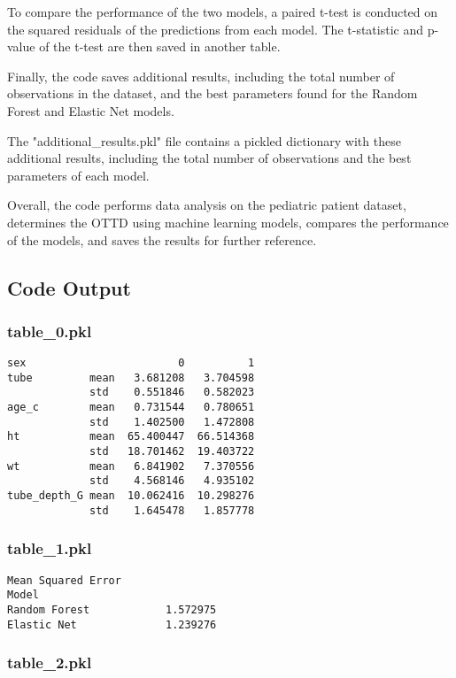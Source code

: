 \documentclass[11pt]{article}
\begin{document}
To compare the performance of the two models, a paired t-test is conducted on the squared residuals of the predictions from each model. The t-statistic and p-value of the t-test are then saved in another table.

Finally, the code saves additional results, including the total number of observations in the dataset, and the best parameters found for the Random Forest and Elastic Net models.

The "additional\_results.pkl" file contains a pickled dictionary with these additional results, including the total number of observations and the best parameters of each model.

Overall, the code performs data analysis on the pediatric patient dataset, determines the OTTD using machine learning models, compares the performance of the models, and saves the results for further reference.

\subsection{Code Output}

\subsubsection*{table\_0.pkl}

\begin{Verbatim}[tabsize=4]
sex                        0          1
tube         mean   3.681208   3.704598
             std    0.551846   0.582023
age_c        mean   0.731544   0.780651
             std    1.402500   1.472808
ht           mean  65.400447  66.514368
             std   18.701462  19.403722
wt           mean   6.841902   7.370556
             std    4.568146   4.935102
tube_depth_G mean  10.062416  10.298276
             std    1.645478   1.857778
\end{Verbatim}

\subsubsection*{table\_1.pkl}

\begin{Verbatim}[tabsize=4]
               Mean Squared Error
Model
Random Forest            1.572975
Elastic Net              1.239276
\end{Verbatim}

\subsubsection*{table\_2.pkl}
\end{document}
